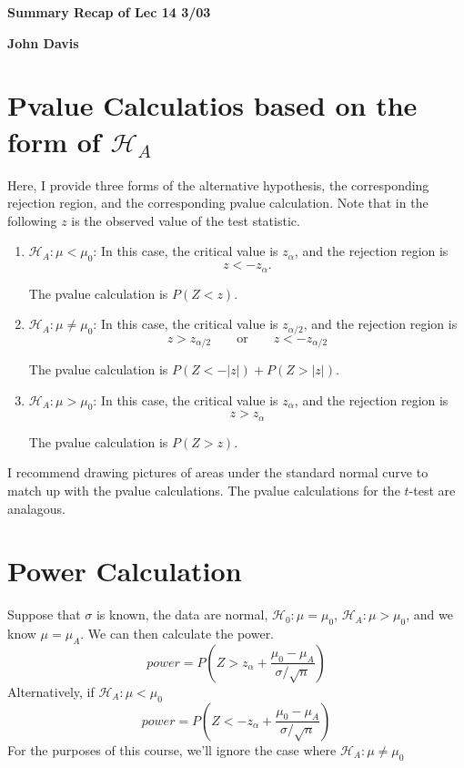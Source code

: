 \documentclass[11 pt]{article}
\newcommand{\Title}[1]{\begin{center}{\Large \bf #1} \end{center}}
\newcommand{\ho}{\mathcal{H}_0}
\newcommand{\mun}{\mu_0}
\newcommand{\ha}{\mathcal{H}_A}
\newcommand{\zc}{z_{\alpha}}
\newcommand{\zctwo}{z_{\alpha/2}}
\begin{document}
\Title{Summary Recap of Lec 14 3/03}
\Title{John Davis}


\section*{Pvalue Calculatios based on the form of $\ha$}

Here, I provide three forms of the alternative hypothesis, the corresponding rejection region, and the corresponding pvalue calculation. Note that in the following $z$ is the observed value of the test statistic. 

\begin{enumerate}
  \item $\ha: \mu < \mun$: In this case, the critical value is $\zc$, and the rejection region is
\[
z < -\zc.
\]
\begin{framed}
The pvalue calculation is $P(Z < z)$.
\end{framed}

  \item $\ha: \mu \neq \mun$: In this case, the critical value is $\zctwo$, and the rejection region is
\[
z > \zctwo \qquad \text{or} \qquad z < - \zctwo
\]
\begin{framed}
The pvalue calculation is $P(Z < -|z|) + P(Z > |z|)$.
\end{framed}

  \item $\ha: \mu > \mun$: In this case, the critical value is $\zc$, and the rejection region is
\[
z > \zc
\]
\begin{framed}
The pvalue calculation is $P(Z > z)$.
\end{framed}
\end{enumerate}

I recommend drawing pictures of areas under the standard normal curve to match up with the pvalue calculations. The pvalue calculations for the $t$-test are analagous. 

\section*{Power Calculation}

Suppose that $\sigma$ is known, the data are normal, $\ho: \mu = \mun$, $\ha: \mu > \mun$, and we know $\mu = \mu_A$. We can then calculate the power.
\[
power = P \left ( Z > z_{\alpha} + \frac{\mun - \mu_A}{\sigma / \sqrt{n}} \right ) 
\]
Alternatively, if $\ha: \mu < \mun$
\[
power = P \left ( Z < -z_{\alpha} + \frac{\mun - \mu_A}{\sigma / \sqrt{n}} \right ) 
\]
For the purposes of this course, we'll ignore the case where $\ha: \mu \neq \mun$
\end{document}
